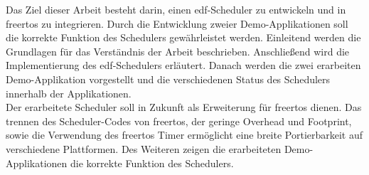 \documentclass[../EDF Master Thesis.tex]{subfiles}
\begin{document}
    Das Ziel dieser Arbeit besteht darin, einen \ac{edf}-Scheduler zu entwickeln und in \ac{freertos} zu integrieren.
    Durch die Entwicklung zweier Demo-Applikationen soll die korrekte Funktion des Schedulers gewährleistet werden.
    Einleitend werden die Grundlagen für das Verständnis der Arbeit beschrieben.
    Anschließend wird die Implementierung des \ac{edf}-Schedulers erläutert.
    Danach werden die zwei erarbeiten Demo-Applikation vorgestellt und die verschiedenen Status des Schedulers innerhalb der Applikationen.\\
    Der erarbeitete Scheduler soll in Zukunft als Erweiterung für \ac{freertos} dienen.
    Das trennen des Scheduler-Codes von \ac{freertos}, der geringe Overhead und Footprint, sowie die Verwendung des \ac{freertos} Timer ermöglicht eine breite Portierbarkeit auf verschiedene Plattformen.
    Des Weiteren zeigen die erarbeiteten Demo-Applikationen die korrekte Funktion des Schedulers.
\end{document}
